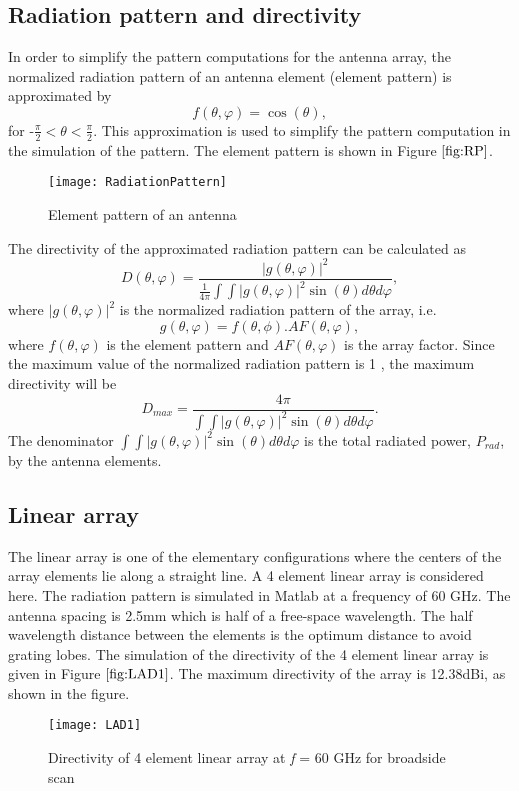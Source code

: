 \documentclass[titlepage]{article}
\begin{document}
\subsection{Radiation pattern and directivity}
In order to simplify the pattern computations for the antenna array, the normalized radiation pattern of an antenna element (element pattern) is approximated by
\begin{equation}
f(\theta,\varphi)=\cos(\theta),
\end{equation}
for -$\frac{\pi}{2}<\theta<\frac{\pi}{2}$. This approximation is used to simplify the pattern computation in the simulation of the pattern. The element pattern is shown in Figure $\ref{fig:RP}$.
\begin{figure}[!hbp]
 \centering
 \texttt{[image: RadiationPattern]}
 \caption{Element pattern of an antenna}
 \label{fig:RP}
\end{figure}
\newline
The directivity of the approximated radiation pattern can be calculated as
\begin{equation}
D(\theta,\varphi) = \frac{|g(\theta,\varphi)|^2}{\frac{1}{4\pi}\int\int|g(\theta,\varphi)|^2\sin(\theta)d\theta d\varphi} ,
\end{equation}
where $|g(\theta,\varphi)|^2$ is the normalized radiation pattern of the array, i.e.
\begin{equation}
    g(\theta,\varphi)=f(\theta,\phi).AF(\theta,\varphi) ,
\end{equation}
where $f(\theta,\varphi)$ is the element pattern and $AF(\theta,\varphi)$ is the array factor.\newline
Since the maximum value of the normalized radiation pattern is 1 , the maximum directivity will be
\begin{equation}
D_{max} = \frac{4\pi}{\int\int|g(\theta,\varphi)|^2\sin(\theta)d\theta d\varphi} .
\label{equ:Maxdir}
\end{equation}
The denominator $\int\int|g(\theta,\varphi)|^2\sin(\theta)d\theta d\varphi$ is the total radiated power, $P_{rad}$, by the antenna elements.
\subsection{Linear array}
The linear array is one of the elementary configurations where the centers of the array elements lie along a straight line. A 4 element linear array is considered here. The radiation pattern is simulated in Matlab at a frequency of 60 GHz. The antenna spacing is 2.5mm which is half of a free-space wavelength. The half wavelength distance between the elements is the optimum distance to avoid grating lobes. The simulation of the directivity of the 4 element linear array is given in Figure $\ref{fig:LAD1}$. The maximum directivity of the array is 12.38dBi, as shown in the figure.
\begin{figure}[!hbp]
    \centering
    \texttt{[image: LAD1]}
    \caption{Directivity of 4 element linear array at \emph{f }= 60 GHz for broadside scan}
    \label{fig:LAD1}
\end{figure}
\end{document}
